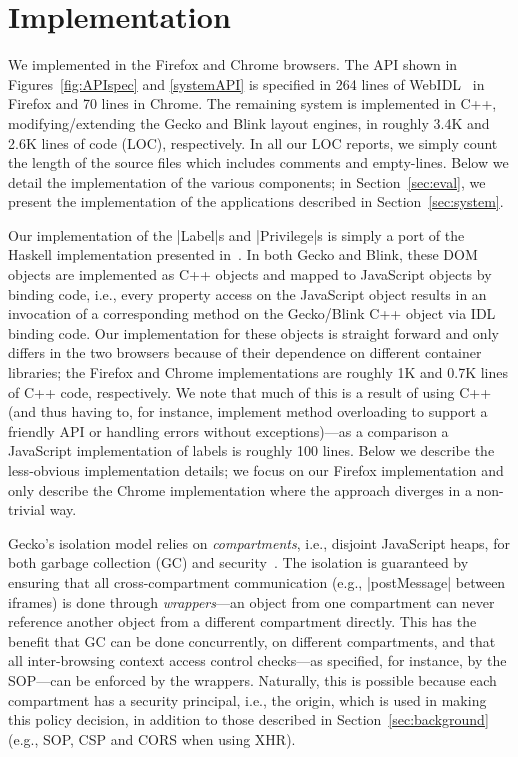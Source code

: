 \section{Implementation}
\label{sec:implementation}

We implemented \sys{} in the Firefox and Chrome browsers.
%
The API shown in Figures~\ref{fig:APIspec} and \ref{systemAPI} is specified in 264
lines of WebIDL~\cite{webidl} in Firefox and 70 lines in Chrome.
%
The remaining system is implemented in C++, modifying/extending the Gecko and
Blink layout engines, in roughly 3.4K and 2.6K lines of code (LOC),
respectively.
%
In all our LOC reports, we simply count the length of the source files which
includes comments and empty-lines.
%
Below we detail the implementation of the various \sys{} components;
in Section~\ref{sec:eval}, we present the implementation of the
applications described in Section~\ref{sec:system}.

%
Our implementation of the \js|Label|s and \js|Privilege|s is simply a port
of the Haskell implementation presented
in~\cite{stefan:2011:dclabels,stefan:2011:flexible}. 
%
In both Gecko and Blink, these DOM objects are implemented as C++ objects and
mapped to JavaScript objects by binding code, i.e., every property access on
the JavaScript object results in an invocation of a corresponding method on the
Gecko/Blink C++ object via IDL binding code.
%
Our implementation for these objects  is straight forward and only differs in
the two browsers because of their dependence on different container libraries;
the Firefox and Chrome implementations are roughly 1K and 0.7K lines of C++
code, respectively.
%
We note that much of this is a result of using C++ (and thus having
to, for instance, implement method overloading to support a friendly
API or handling errors without exceptions)---as a comparison a
JavaScript implementation of labels is roughly 100 lines.
%
Below we describe the less-obvious implementation details; we focus on our
Firefox implementation and only describe the Chrome implementation where the
approach diverges in a non-trivial way.
%


Gecko's isolation model relies on \emph{compartments}, i.e., disjoint
JavaScript heaps, for both garbage collection (GC) and
security~\cite{wagner2011compartmental}.
%
The isolation is guaranteed by ensuring that all cross-compartment
communication (e.g., \js|postMessage| between iframes) is done through
\emph{wrappers}---an object from one compartment can never reference
another object from a different compartment directly.
%
This has the benefit that GC can be done concurrently, on different compartments,
and that all inter-browsing context access control checks---as specified, for
instance, by the SOP---can be enforced by the wrappers.
%
Naturally, this is possible because each compartment has a security
principal, i.e., the origin, which is used in making this policy
decision, in addition to those described in
Section~\ref{sec:background} (e.g., SOP, CSP and CORS when using XHR).

